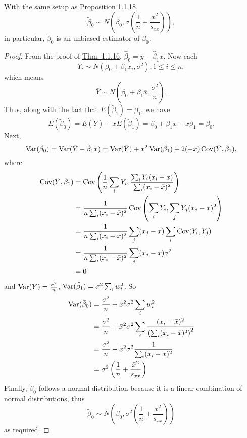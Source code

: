 \documentclass[11pt,fleqn]{book} %
\begin{document}
\begin{proposition} \label{prop:1121}
With the same setup as \hyperref[prop:1118]{Proposition 1.1.18}, 
\[
\tilde{\beta}_0 \sim N\left(\beta_0, \sigma\left(\frac1n + \frac{\bar{x}^2}{s_{xx}}\right)\right),
\]
in particular, \(\tilde{\beta}_0\) is an unbiased estimator of \(\beta_0\).
\end{proposition}
\begin{proof} From the proof of \hyperref[thm:1116]{Thm. 1.1.16}, \(\hat{\beta}_0 = \bar{y} - \hat{\beta}_1\bar{x}\). Now each
\[
Y_i \sim N(\beta_0 + \beta_1x_i, \sigma^2), 1 \leq i \leq n,
\]
which means
\[
\bar{Y} \sim N\left(\beta_0 + \beta_1\bar{x}, \frac{\sigma^2}{n}\right).
\]
\indent Thus, along with the fact that \(E(\tilde{\beta}_1) = \beta_1\), we have
\[
E(\tilde{\beta}_0) = E(\bar{Y}) - \bar{x}E(\tilde{\beta}_1) = \beta_0 + \beta_1\bar{x} - \bar{x}\beta_1 = \beta_0.
\]
\indent Next,
\[
\operatorname{Var}(\tilde{\beta}_0) = \operatorname{Var}(\bar{Y} - \tilde{\beta}_1\bar{x}) = \operatorname{Var}(\bar{Y}) + \bar{x}^2\operatorname{Var}(\tilde{\beta}_1) + 2(-\bar{x})\operatorname{Cov}(\bar{Y}, \tilde{\beta}_1),
\]
where
\[
\begin{aligned}
\operatorname{Cov}(\bar{Y}, \tilde{\beta}_1) &= \operatorname{Cov}\left(\frac1n\sum_iY_i, \frac{\sum_iY_i(x_i - \bar{x})}{\sum_i(x_i - \bar{x})^2}\right) \\
&= \frac{1}{n\sum_i(x_i - \bar{x})^2}\operatorname{Cov}\left(\sum_iY_i, \sum_jY_j(x_j - \bar{x})^2\right) \\
&= \frac{1}{n\sum_i(x_i - \bar{x})^2}\sum_j(x_j - \bar{x})\sum_i\operatorname{Cov}(Y_i, Y_j) \\
&= \frac{1}{n\sum_i(x_i - \bar{x})^2}\sum_j(x_j - \bar{x})\sigma^2 \\
&= 0
\end{aligned}
\]
and \(\operatorname{Var}(\bar{Y}) = \frac{\sigma^2}{n}\), \(\operatorname{Var}(\tilde{\beta}_1) = \sigma^2\sum_iw_i^2\). So
\[
\begin{aligned}
\operatorname{Var}(\tilde{\beta}_0) &= \frac{\sigma^2}{n} + \bar{x}^2\sigma^2\sum_iw_i^2 \\
&= \frac{\sigma^2}{n} + \bar{x}^2\sigma^2\sum_i\frac{(x_i - \bar{x})^2}{\left(\sum_i(x_i - \bar{x})^2\right)^2} \\
&= \frac{\sigma^2}{n} + \bar{x}^2\sigma^2\frac{1}{\sum_i(x_i - \bar{x})^2} \\
&= \sigma^2\left(\frac1n + \frac{\bar{x}^2}{s_{xx}}\right)
\end{aligned}
\]
\indent Finally, \(\tilde{\beta}_0\) follows a normal distribution because it is a linear combination of normal distributions, thus
\[
\tilde{\beta}_0 \sim N\left(\beta_0, \sigma^2\left(\frac1n + \frac{\bar{x}^2}{s_{xx}}\right)\right)
\]
as required.
\end{proof}
\end{document}
